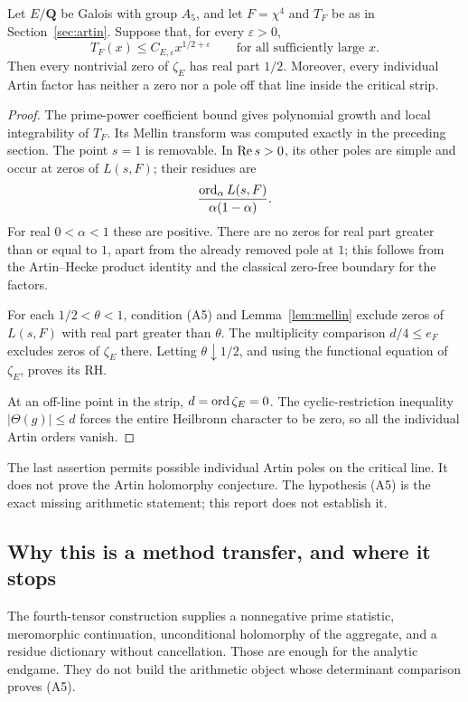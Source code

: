 \begin{theorem}
\label{thm:a5target}
Let \(E/\mathbf Q\) be Galois with group \(A_5\), and let \(F=\chi^4\) and \(T_F\) be as in Section~\ref{sec:artin}. Suppose that, for every \(\varepsilon>0\),
\[
 T_F(x)\le C_{E,\varepsilon}x^{1/2+\varepsilon}
 \qquad\text{for all sufficiently large }x.
 \tag{A5}
\]
Then every nontrivial zero of \(\zeta_E\) has real part \(1/2\). Moreover, every individual Artin factor has neither a zero nor a pole off that line inside the critical strip.
\end{theorem}

\begin{proof}
The prime-power coefficient bound gives polynomial growth and local integrability of \(T_F\). Its Mellin transform was computed exactly in the preceding section. The point \(s=1\) is removable. In \(\operatorname{Re} s>0\), its other poles are simple and occur at zeros of \(L(s,F)\); their residues are
\[
 \frac{\operatorname{ord}_\alpha L(s,F)}{\alpha(1-\alpha)}.
\]
For real \(0<\alpha<1\) these are positive. There are no zeros for real part greater than or equal to \(1\), apart from the already removed pole at \(1\); this follows from the Artin--Hecke product identity and the classical zero-free boundary for the factors.

For each \(1/2<\theta<1\), condition (A5) and Lemma~\ref{lem:mellin} exclude zeros of \(L(s,F)\) with real part greater than \(\theta\). The multiplicity comparison \(d/4\le e_F\) excludes zeros of \(\zeta_E\) there. Letting \(\theta\downarrow1/2\), and using the functional equation of \(\zeta_E\), proves its RH.

At an off-line point in the strip, \(d=\operatorname{ord}\zeta_E=0\). The cyclic-restriction inequality \(|\Theta(g)|\le d\) forces the entire Heilbronn character to be zero, so all the individual Artin orders vanish.
\end{proof}

The last assertion permits possible individual Artin poles on the critical line. It does not prove the Artin holomorphy conjecture. The hypothesis (A5) is the exact missing arithmetic statement; this report does not establish it.

\subsection{Why this is a method transfer, and where it stops}
The fourth-tensor construction supplies a nonnegative prime statistic, meromorphic continuation, unconditional holomorphy of the aggregate, and a residue dictionary without cancellation. Those are enough for the analytic endgame. They do not build the arithmetic object whose determinant comparison proves (A5).

